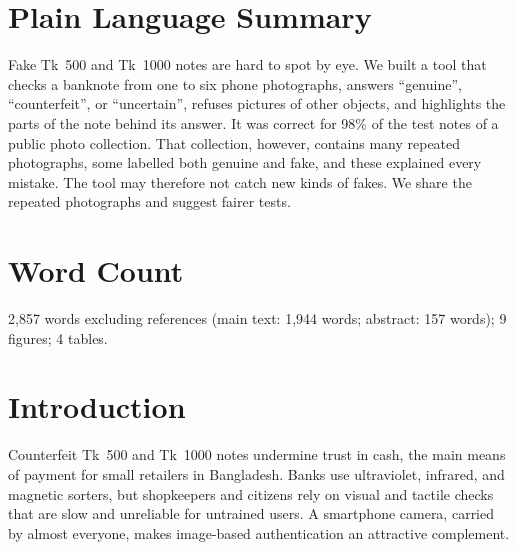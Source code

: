 \documentclass[pdflatex,sn-mathphys-num]{sn-jnl}
\begin{document}
\section*{Plain Language Summary}
Fake Tk~500 and Tk~1000 notes are hard to spot by eye. We built a tool that checks a
banknote from one to six phone photographs, answers ``genuine'', ``counterfeit'', or
``uncertain'', refuses pictures of other objects, and highlights the parts of the note
behind its answer. It was correct for 98\% of the test notes of a public photo
collection. That collection, however, contains many repeated photographs, some labelled
both genuine and fake, and these explained every mistake. The tool may therefore not
catch new kinds of fakes. We share the repeated photographs and suggest fairer tests.

\section*{Word Count}
2{,}857 words excluding references (main text: 1{,}944 words; abstract: 157 words);
9 figures; 4 tables.

\section{Introduction}\label{sec:intro}

Counterfeit Tk~500 and Tk~1000 notes undermine trust in cash, the main means of payment
for small retailers in Bangladesh. Banks use ultraviolet, infrared, and magnetic sorters,
but shopkeepers and citizens rely on visual and tactile checks that are slow and
unreliable for untrained users. A smartphone camera, carried by almost everyone, makes
image-based authentication an attractive complement.
\end{document}
